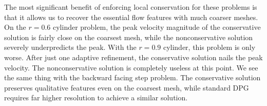 \documentclass[Proposal.tex]{subfiles}
\begin{document}
The most significant benefit of enforcing local conservation for these
problems is that it allows us to recover the essential flow features with much
coarser meshes. On the $r=0.6$ cylinder problem, the peak velocity magnitude
of the conservative solution is fairly close on the coarsest mesh, while the
nonconservative solution severely underpredicts the peak. With the $r=0.9$
cylinder, this problem is only worse. After just one adaptive
refinement, the conservative solution nails the peak velocity. The
nonconservative solution is completely useless at this point. We see the same
thing with the backward facing step problem. The conservative solution preserves
qualitative features even on the coarsest mesh, while standard DPG requires far higher resolution
to achieve a similar solution. 
\end{document}
